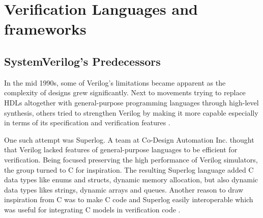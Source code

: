 \section{Verification Languages and frameworks} %


\subsection{SystemVerilog's Predecessors} %

In the mid 1990s, some of Verilog's limitations became apparent as the complexity of designs grew significantly. Next
to movements trying to replace HDLs altogether with general-purpose programming languages through high-level
synthesis, others tried to strengthen Verilog by making it more capable especially in terms of its specification and
verification features \cite[Sec. 6]{flake2020a}.

One such attempt was Superlog. A team at Co-Design Automation Inc. thought that Verilog lacked features of
general-purpose languages to be efficient for verification. Being focused preserving the high performance of Verilog
simulators, the group turned to C for inspiration. The resulting Superlog language added C data types like enums and
structs, dynamic memory allocation, but also dynamic data types likes strings, dynamic arrays and queues. Another
reason to draw inspiration from C was to make C code and Superlog easily interoperable which was useful for
integrating C models in verification code \cite[Sec. 6]{flake2020a}.

